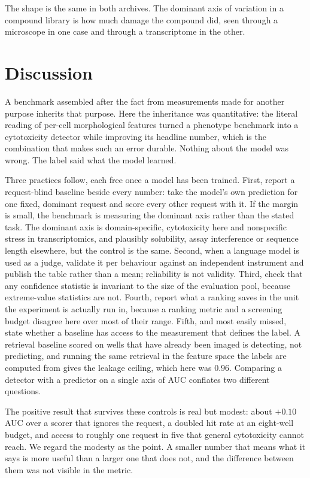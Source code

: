 \documentclass[11pt]{article}
\begin{document}
The shape is the same in both archives. The dominant axis of variation in a compound
library is how much damage the compound did, seen through a microscope in one case and
through a transcriptome in the other.

\section{Discussion}

A benchmark assembled after the fact from measurements made for another purpose inherits
that purpose. Here the inheritance was quantitative: the literal reading of per-cell
morphological features turned a phenotype benchmark into a cytotoxicity detector while
improving its headline number, which is the combination that makes such an error durable.
Nothing about the model was wrong. The label said what the model learned.

Three practices follow, each free once a model has been trained. First, report a
request-blind baseline beside every number: take the model's own prediction for one fixed,
dominant request and score every other request with it. If the margin is small, the
benchmark is measuring the dominant axis rather than the stated task. The dominant axis is
domain-specific, cytotoxicity here and nonspecific stress in transcriptomics, and plausibly
solubility, assay interference or sequence length elsewhere, but the control is the same.
Second, when a language model is used as a judge, validate it per behaviour against an
independent instrument and publish the table rather than a mean; reliability is not
validity. Third, check that any confidence statistic is invariant to the size of the
evaluation pool, because extreme-value statistics are not. Fourth, report what a ranking saves in the unit the
experiment is actually run in, because a ranking metric and a screening budget disagree
here over most of their range. Fifth, and most easily missed, state whether a baseline has
access to the measurement that defines the label. A retrieval
baseline scored on wells that have already been imaged is detecting, not predicting, and
running the same retrieval in the feature space the labels are computed from gives the
leakage ceiling, which here was $0.96$. Comparing a detector with a predictor on a single
axis of AUC conflates two different questions.

The positive result that survives these controls is real but modest: about $+0.10$ AUC over
a scorer that ignores the request, a doubled hit rate at an eight-well budget, and access to
roughly one request in five that general cytotoxicity cannot reach. We regard the modesty
as the point. A smaller number that means what it says is more useful than a larger one
that does not, and the difference between them was not visible in the metric.
\end{document}
